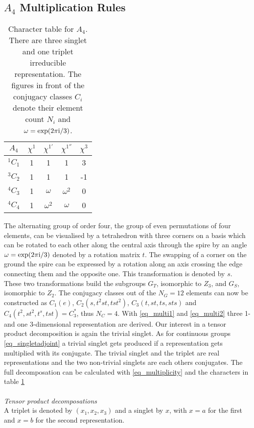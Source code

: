 \begin{appendix}
\section{$A_4$ Multiplication Rules}
\label{sec_appendixA4}
\begin{table}[t]
 \begin{tabular}{c|cccc}
 $A_4$ & $\chi^1$ & $\chi^{1'}$ & $\chi^{1''}$ & $\chi^3$ \\
 \hline
 $^1C_1$ & 1 & 1 & 1 & 3\\
 $^3C_2$ & 1 & 1 & 1& -1\\
 $^4C_3$ & 1 & $\omega$& $\omega^2$ & 0\\
 $^4C_4$ & 1 & $\omega^2$& $\omega$ & 0
 \end{tabular}
\caption{Character table for $A_4$. There are three singlet and one triplet irreducible representation. The figures in front of the conjugacy
classes $C_i$ denote their element count $N_i$ and $\omega=\exp(2\pi\text{i}/3)$.}
\label{tab_charactertable}
\end{table}
The alternating group of order four, the group of even permutations of four elements, 
can be visualised by a tetrahedron with three corners on a basis which can be rotated to each other
along the central axis through the spire by an angle $\omega=\exp(2\pi\text{i}/3)$ denoted by a rotation matrix $t$. The swapping of a corner on the ground
the spire can be expressed by a rotation along an axis crossing the edge connecting them and the opposite one. This transformation is denoted by 
$s$. These two transformations build the subgroups $G_T$, isomorphic to $Z_3$, and $G_S$, isomorphic to $Z_2$\cite{0512103}. 
The conjugacy classes out of the $N_G=12$ elements can now be constructed as $C_1(e)$, $C_2(s,t^2st,tst^2)$, $C_3(t,st,ts,sts)$ and 
$C_4(t^2,st^2,t^s,tst)=C_3^*$, thus $N_C=4$. With \eqref{eq_multi1} and \eqref{eq_multi2} three 1- and one 3-dimensional representation are derived.
Our interest in a tensor product decomposition is again the trivial singlet. As for continuous groups \eqref{eq_singletadjoint} a trivial singlet 
gets produced if a representation gets multiplied with its conjugate. The trivial singlet and the triplet are real representations and the two
non-trivial singlets are each others conjugates. The full decomposation can be calculated with \eqref{eq_multiplicity} and the characters in table
\ref{tab_charactertable}
\\ \\ \textit{Tensor product decomposations}\\
A triplet is denoted by $(x_1,x_2,x_3)$ and a singlet by $x$, with $x=a$ for the first and $x=b$ for the second representation.

\end{appendix}
